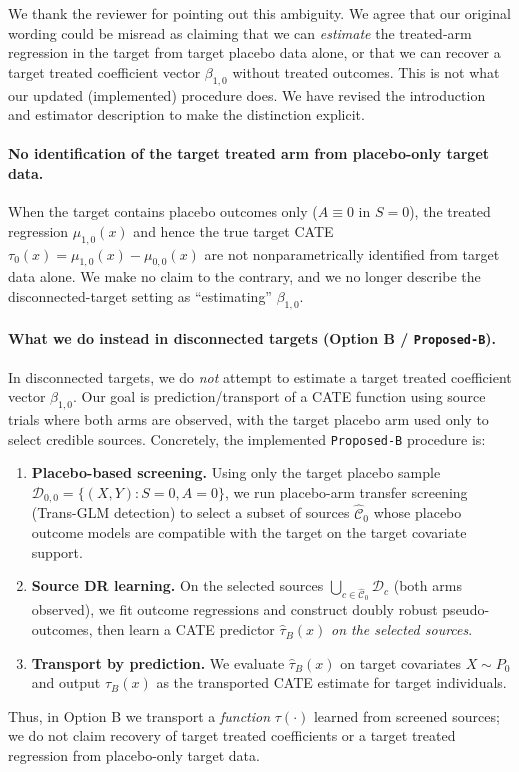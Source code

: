{\color{blue}
We thank the reviewer for pointing out this ambiguity. We agree that our original wording could be misread as claiming that we can \emph{estimate} the treated-arm regression in the target from target placebo data alone, or that we can recover a target treated coefficient vector $\beta_{1,0}$ without treated outcomes. This is not what our updated (implemented) procedure does. We have revised the introduction and estimator description to make the distinction explicit.

\paragraph{No identification of the target treated arm from placebo-only target data.}
When the target contains placebo outcomes only ($A\equiv 0$ in $S=0$), the treated regression $\mu_{1,0}(x)$ and hence the true target CATE $\tau_0(x)=\mu_{1,0}(x)-\mu_{0,0}(x)$ are not nonparametrically identified from target data alone. We make no claim to the contrary, and we no longer describe the disconnected-target setting as ``estimating'' $\beta_{1,0}$.

\paragraph{What we do instead in disconnected targets (Option B / \texttt{Proposed-B}).}
In disconnected targets, we do \emph{not} attempt to estimate a target treated coefficient vector $\beta_{1,0}$. Our goal is prediction/transport of a CATE function using source trials where both arms are observed, with the target placebo arm used only to select credible sources. Concretely, the implemented \texttt{Proposed-B} procedure is:
\begin{enumerate}[leftmargin=*]
\item \textbf{Placebo-based screening.} Using only the target placebo sample $\mathcal{D}_{0,0}=\{(X,Y):S=0,A=0\}$, we run placebo-arm transfer screening (Trans-GLM detection) to select a subset of sources $\widehat{\mathcal{C}}_0$ whose placebo outcome models are compatible with the target on the target covariate support.
\item \textbf{Source DR learning.} On the selected sources $\bigcup_{c\in\widehat{\mathcal{C}}_0}\mathcal{D}_c$ (both arms observed), we fit outcome regressions and construct doubly robust pseudo-outcomes, then learn a CATE predictor $\widehat{\tau}_B(x)$ \emph{on the selected sources}.
\item \textbf{Transport by prediction.} We evaluate $\widehat{\tau}_B(x)$ on target covariates $X\sim P_0$ and output $\widehat{\tau}_B(x)$ as the transported CATE estimate for target individuals.
\end{enumerate}
Thus, in Option B we transport a \emph{function} $\tau(\cdot)$ learned from screened sources; we do not claim recovery of target treated coefficients or a target treated regression from placebo-only target data.

}
